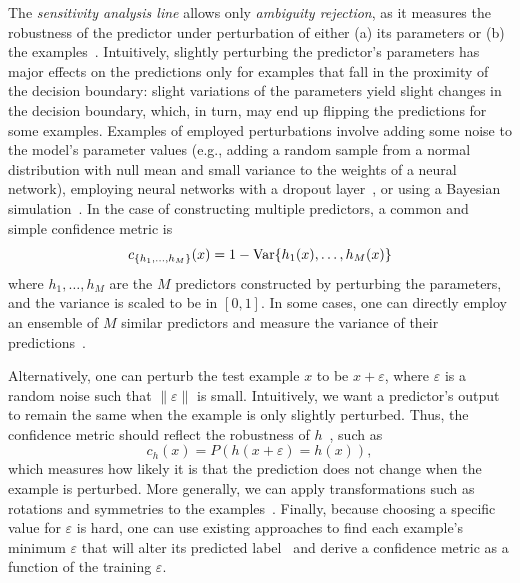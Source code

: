 The \emph{sensitivity analysis line} allows only \emph{ambiguity rejection}, as it measures the robustness of the predictor under perturbation of either (a) its parameters or (b) the examples~\citep{Lewicke2008,Hellman1970}. 
Intuitively, slightly perturbing the predictor's parameters has major effects on the predictions only for examples that fall in the proximity of the decision boundary: slight variations of the parameters yield slight changes in the decision boundary, which, in turn, may end up flipping the predictions for some examples. Examples of employed perturbations involve adding some noise to the model's parameter values (e.g., adding a random sample from a normal distribution with null mean and small variance to the weights of a neural network), employing neural networks with a dropout layer~\citep{NIPS2017_7073}, or using a Bayesian simulation~\citep{Perini2020}.
In the case of constructing multiple predictors, a common and simple confidence metric is
\begin{equation*}
    c_{\{h_1,\dots, h_M\}} (x) = 1 - \mathrm{Var}\{h_1(x),\dots,h_M(x)\}
\end{equation*}
where $h_1, \dots, h_M$ are the $M$ predictors constructed by perturbing the parameters, and the variance is scaled to be in $[0,1]$. In some cases, one can directly employ an ensemble of $M$ similar predictors and measure the variance of their predictions~\citep{Fumera2004,Jiang2020}.

Alternatively, one can perturb the test example $x$ to be $x+\varepsilon$, where $\varepsilon$ is a random noise such that $\|\varepsilon\|$ is small. Intuitively, we want a predictor's output to remain the same when the example is only slightly perturbed. Thus, the confidence metric should reflect the robustness of $h$~\citep{Mena2020,Denis2020,Joana2021}, such as
\begin{equation*}
    c_{h} (x) = P(h(x+\varepsilon) = h(x)),
\end{equation*}
which measures how likely it is that the prediction does not change when the example is perturbed. More generally, we can apply transformations such as rotations and symmetries to the examples~\citep{Chen2018}. Finally, because choosing a specific value for $\varepsilon$ is hard, one can use existing approaches to find each example's minimum $\varepsilon$ that will alter its predicted label~\citep{Devos2021} and derive a confidence metric as a function of the training $\varepsilon$.

